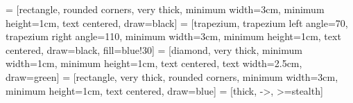 
\usepackage{times}
\usepackage{lmodern}
\usepackage[T1]{fontenc}

\usepackage{amsmath, amsthm, mathrsfs, amssymb, amsfonts, dsfont, nicefrac, stmaryrd, yhmath}
\usepackage{mathtools}
\usepackage{cancel}
\usepackage{multirow}

\usepackage{csquotes}
\usepackage{cite}

\usepackage{subcaption}

\usepackage{tikz}
\usetikzlibrary{plotmarks, arrows, positioning, shapes, calc, intersections, through, backgrounds}
\usepackage{pgfplots}
\pgfplotsset{compat=newest}
\usepackage{pgfmath, pgffor}
\usepackage{pgfplotstable}
\usepackage{booktabs}
\usepackage{longtable}

\usepackage{animate}
\usepackage{pgfpages}
\usepackage{changepage}

\usepackage{xstring}
\usepackage{soul}


 = [rectangle, rounded corners, very thick, minimum width=3cm, minimum height=1cm, text centered, draw=black]
 = [trapezium, trapezium left angle=70, trapezium right angle=110, minimum width=3cm, minimum height=1cm, text centered, draw=black, fill=blue!30]
 = [diamond, very thick, minimum width=1cm, minimum height=1cm, text centered, text width=2.5cm, draw=green]
 = [rectangle, very thick, rounded corners, minimum width=3cm, minimum height=1cm, text centered, draw=blue]
 = [thick, ->, >=stealth]

